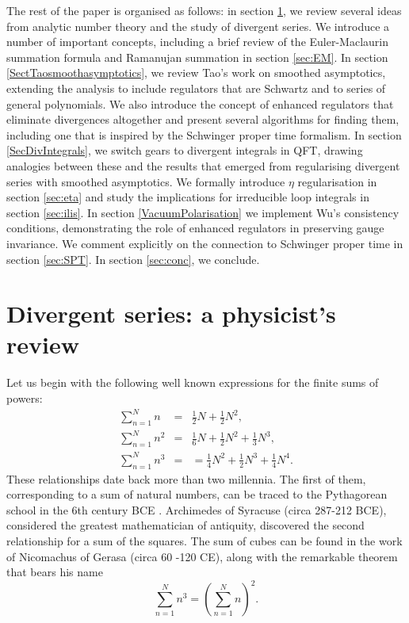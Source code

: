 \documentclass[12pt, letter]{article}
\begin{document}
The rest of the paper is organised as follows: in section \ref{sec:seriesrev}, we review several ideas from analytic number theory and the study of divergent series. We introduce a number of important concepts, including a brief review of the Euler-Maclaurin summation formula and Ramanujan summation in section \ref{sec:EM}. In section \ref{SectTaosmoothasymptotics}, we review Tao's work on smoothed asymptotics, extending the analysis to include regulators that are Schwartz and to series of general polynomials. We also introduce the concept of enhanced regulators that eliminate divergences altogether and present several algorithms for finding them, including one that is inspired by the Schwinger proper time formalism. In section \ref{SecDivIntegrals}, we switch gears to divergent integrals in QFT, drawing analogies between these and the results that emerged from regularising divergent series with smoothed asymptotics. We formally introduce $\eta$ regularisation in section \ref{sec:eta} and study the implications for irreducible loop integrals in section \ref{sec:ilis}.  In section \ref{VacuumPolarisation} we implement Wu's consistency conditions, demonstrating the role of enhanced regulators in preserving gauge invariance. We comment explicitly on the    connection to Schwinger proper time in section \ref{sec:SPT}. In section \ref{sec:conc}, we conclude.  



\section{Divergent series: a physicist's review} \label{sec:seriesrev}

Let us begin with the following well known expressions for the finite sums of powers:
\begin{eqnarray}\label{Powersum_s1}
\sum_{n=1}^N n & =&  \frac{1}{2}N + \frac{1}{2}N^2,
\\
\sum_{n=1}^N n^2 & =& \frac{1}{6} N + \frac{1}{2}N^2 + \frac{1}{3}N^3, \label{Powersum_s2}
\\
\sum_{n=1}^N n^3  &=&  = \frac{1}{4}N^2 + \frac{1}{2}N^3 + \frac{1}{4}N^4. \label{Powersum_s3}
\end{eqnarray}
These relationships date back more than two millennia. The first of them, corresponding to a sum of natural numbers, can be traced to the Pythagorean school in the 6th century BCE  \citep{Peng02a, Sant17}. Archimedes of Syracuse (circa 287-212 BCE), considered the greatest mathematician of antiquity, discovered the second relationship for a sum of the squares. The sum of cubes can be found in the work of Nicomachus of Gerasa (circa 60 -120 CE),  along with the remarkable theorem that bears his name $$\sum \limits_{n=1}^{N} n^3 = \left(\sum \limits_{n=1}^{N} n\right)^2.$$
\end{document}
